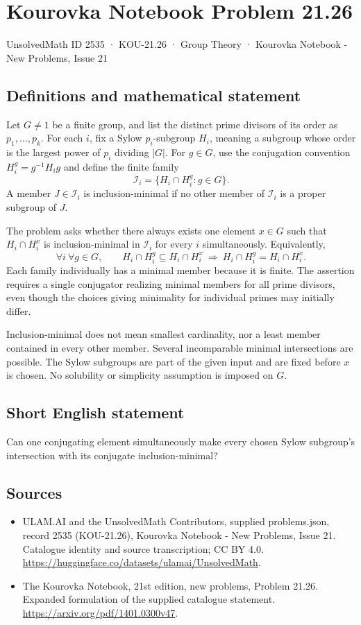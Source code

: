 \documentclass[11pt,a4paper]{article}
\begin{document}
\section*{Kourovka Notebook Problem 21.26}\label{2535}
{\small UnsolvedMath ID 2535 · KOU-21.26 · Group Theory · Kourovka Notebook - New Problems, Issue 21}
\subsection{Definitions and mathematical statement}
Let $G\ne1$ be a finite group, and list the distinct prime divisors of
its order as $p_1,\ldots,p_k$. For each $i$, fix a Sylow $p_i$-subgroup
$H_i$, meaning a subgroup whose order is the largest power of $p_i$
dividing $|G|$. For $g\in G$, use the conjugation convention
$H_i^g=g^{-1}H_i g$ and define the finite family
\[
 \mathcal I_i=\{H_i\cap H_i^g:g\in G\}.
\]
A member $J\in\mathcal I_i$ is inclusion-minimal if no other member of
$\mathcal I_i$ is a proper subgroup of $J$.

The problem asks whether there always exists one element $x\in G$
such that $H_i\cap H_i^x$ is inclusion-minimal in $\mathcal I_i$ for
every $i$ simultaneously. Equivalently,
\[
 \forall i\ \forall g\in G,\qquad
 H_i\cap H_i^g\subseteq H_i\cap H_i^x
 \ \Longrightarrow\ H_i\cap H_i^g=H_i\cap H_i^x.
\]
Each family individually has a minimal member because it is finite.
The assertion requires a single conjugator realizing minimal members
for all prime divisors, even though the choices giving minimality for
individual primes may initially differ.

Inclusion-minimal does not mean smallest cardinality, nor a least member
contained in every other member. Several incomparable minimal intersections
are possible. The Sylow subgroups are part of the given input and are
fixed before $x$ is chosen. No solubility or simplicity assumption is
imposed on $G$.
\subsection{Short English statement}
Can one conjugating element simultaneously make every chosen Sylow subgroup’s intersection with its conjugate inclusion-minimal?
\subsection{Sources}
\begin{itemize}
\item[S1] ULAM.AI and the UnsolvedMath Contributors, supplied problems.json, record 2535 (KOU-21.26), Kourovka Notebook - New Problems, Issue 21. Catalogue identity and source transcription; CC BY 4.0.
\url{https://huggingface.co/datasets/ulamai/UnsolvedMath}.
\item[S2] The Kourovka Notebook, 21st edition, new problems, Problem 21.26. Expanded formulation of the supplied catalogue statement.
\url{https://arxiv.org/pdf/1401.0300v47}.
\end{itemize}
\end{document}
